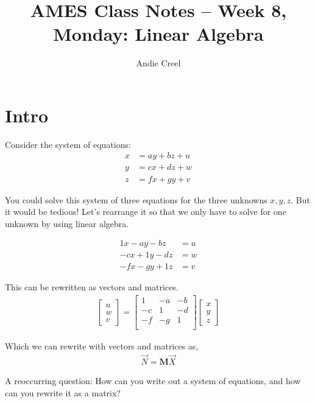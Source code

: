 \documentclass{article}
\title{AMES Class Notes -- Week 8, Monday: Linear Algebra}
\author{Andie Creel}
\begin{document}
\maketitle

\section{Intro}

Consider the system of equations: 
\begin{align}
    x &= ay + bz + u \\
    y &= cx + dz + w \\
    z &= fx + gy + v
\end{align}

You could solve this system of three equations for the three unknowns $x,y,z$. But it would be tedious! Let's rearrange it so that we only have to solve for one unknown by using linear algebra. 

\begin{align}
    1x - ay - bz &= u \\
    -cx + 1y - dz &= w \\
    -f x -gy +1z &= v 
\end{align}

This can be rewritten as vectors and matrices. 
\begin{align}
    \begin{bmatrix}
        u \\
        w \\
        v
    \end{bmatrix} = 
    \begin{bmatrix}
        1 & -a & -b \\
        -c & 1 & -d \\
        -f &  -g & 1 \\
    \end{bmatrix} 
    \begin{bmatrix}
        x \\
        y\\
        z
    \end{bmatrix}
\end{align}

Which we can rewrite with vectors and matrices as, 
\begin{align}
    \Vec{N} = \mathbf{M} \Vec{X}
\end{align}

A reoccurring question: How can you write out a system of equations, and how can you rewrite it as a matrix?
\end{document}
